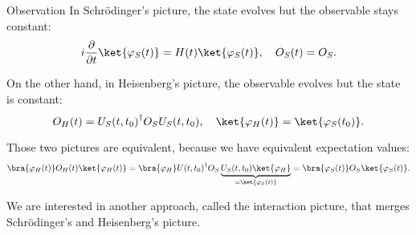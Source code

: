 \documentclass[a4paper]{article}
\begin{document}
\begin{parag}{Observation}
    In Schrödinger's picture, the state evolves but the observable stays constant: 
    \[i \frac{\partial }{\partial t} \ket{\phi_S\left(t\right)} = H\left(t\right) \ket{\phi_S\left(t\right)}, \mathspace O_S\left(t\right) = O_S.\]
    
    On the other hand, in Heisenberg's picture, the observable evolves but the state is constant: 
    \[O_H\left(t\right) = U_S\left(t, t_0\right)^{\dagger} O_S U_S\left(t, t_0\right), \mathspace \ket{\phi_H\left(t\right)} = \ket{\phi_S\left(t_0\right)}.\]
    
    Those two pictures are equivalent, because we have equivalent expectation values: 
    \[\bra{\phi_H\left(t\right)} O_H\left(t\right) \ket{\phi_H\left(t\right)} = \bra{\phi_H} U\left(t, t_0\right)^{\dagger} O_S \underbrace{U_S\left(t, t_0\right) \ket{\phi_H}}_{= \ket{\phi_S\left(t\right)}} = \bra{\phi_S\left(t\right)} O_S \ket{\phi_S\left(t\right)}.\]

    We are interested in another approach, called the interaction picture, that merges Schrödinger's and Heisenberg's picture.
\end{parag}
\end{document}
